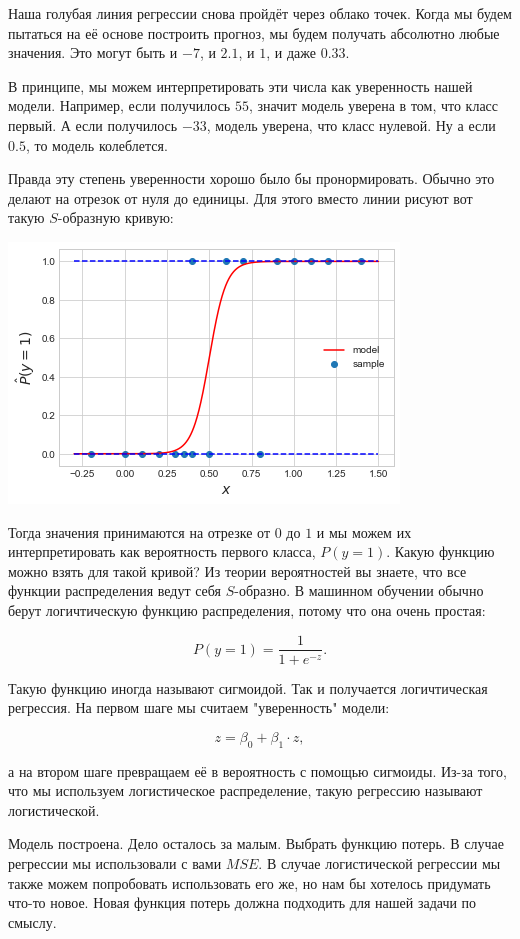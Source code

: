 \documentclass[12pt, a4paper, oneside]{article}
\begin{document}
Наша голубая линия регрессии снова пройдёт через облако точек. Когда мы будем пытаться на её основе построить прогноз, мы будем получать абсолютно любые значения. Это могут быть и $-7$, и $2.1$, и $1$, и даже $0.33$.  

В принципе, мы можем интерпретировать эти числа как уверенность нашей модели. Например, если получилось $55$, значит модель уверена в том, что класс первый. А если получилось $-33$, модель уверена, что класс нулевой. Ну а если $0.5$, то модель колеблется. 

Правда эту степень уверенности хорошо было бы пронормировать. Обычно это делают на отрезок от нуля до единицы. Для этого вместо линии рисуют вот такую $S$-образную  кривую: 

\begin{center}
	\includegraphics[scale=0.7]{logreg_solveprob.png}
\end{center}

Тогда значения принимаются на отрезке от $0$ до $1$ и мы можем их интерпретировать как вероятность первого класса, $P(y = 1)$. Какую функцию можно взять для такой кривой? Из теории вероятностей вы знаете, что все функции распределения ведут себя $S$-образно.  В машинном обучении обычно берут логичтическую функцию распределения, потому что она очень простая: 

$$
P(y = 1) = \frac{1}{1 + e^{-z}}.
$$

Такую функцию иногда называют сигмоидой. Так и получается логичтическая регрессия. На первом шаге мы считаем "уверенность" модели: 

$$
z = \beta_0 + \beta_1 \cdot z,
$$

а на втором шаге превращаем её в вероятность с помощью сигмоиды.  Из-за того, что мы используем логистическое распределение, такую регрессию называют логистической.  

Модель построена. Дело осталось за малым. Выбрать функцию потерь. В случае регрессии мы использовали с вами $MSE$. В случае логистической регрессии мы также можем попробовать использовать его же, но нам бы хотелось придумать что-то новое. Новая функция потерь должна подходить для нашей задачи по смыслу.
\end{document}
